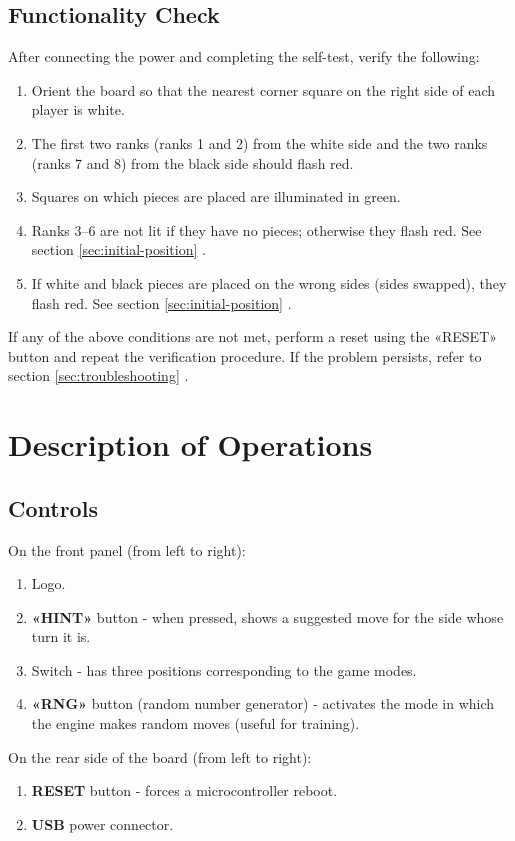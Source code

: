\documentclass[a4paper,12pt]{article}
\begin{document}
\subsection{Functionality Check}
After connecting the power and completing the self-test, verify the following:
\begin{enumerate}
    \item Orient the board so that the nearest corner square on the right side of each player is white.
    \item The first two ranks (ranks 1 and 2) from the white side and the two ranks (ranks 7 and 8) from the black side should flash red.
    \item Squares on which pieces are placed are illuminated in green.
    \item Ranks 3–6 are not lit if they have no pieces; otherwise they flash red. See section \ref{sec:initial-position} .
    \item If white and black pieces are placed on the wrong sides (sides swapped), they flash red. See section \ref{sec:initial-position} .
\end{enumerate}
If any of the above conditions are not met, perform a reset using the «RESET» button and repeat the verification procedure.
If the problem persists, refer to section \ref{sec:troubleshooting} .


\section{Description of Operations}
\label{sec:operations}

\subsection{Controls}
On the front panel (from left to right):
\begin{enumerate}
    \item Logo.
    \item \textbf{«HINT»} button - when pressed, shows a suggested move for the side whose turn it is.
    \item Switch - has three positions corresponding to the game modes.
    \item \textbf{«RNG»} button (random number generator) - activates the mode in which the engine makes random moves (useful for training).
\end{enumerate}
On the rear side of the board (from left to right):
\begin{enumerate}
    \item \textbf{RESET} button - forces a microcontroller reboot.
    \item \textbf{USB} power connector.
\end{enumerate}
\end{document}
